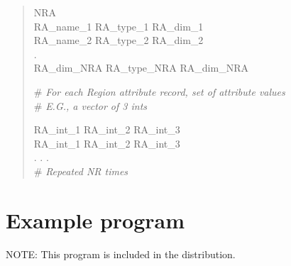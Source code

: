 \documentclass[12pt]{article}
\begin{document}
\begin{verse}
NRA \hspace{0.5ex} \\
RA\_name\_1 \hspace{0.5ex} RA\_type\_1 \hspace{0.5ex} RA\_dim\_1 \\ 
RA\_name\_2 \hspace{0.5ex} RA\_type\_2 \hspace{0.5ex} RA\_dim\_2 \\
. \\
RA\_dim\_NRA \hspace{0.5ex} RA\_type\_NRA \hspace{0.5ex} RA\_dim\_NRA 
\vspace{1ex}

\# \textit{For each Region attribute record, set of attribute values} \\
\# \textit{E.G., a vector of 3 ints}
\vspace{1ex}

RA\_int\_1 \hspace{0.5ex} RA\_int\_2 \hspace{0.5ex} RA\_int\_3 \\
RA\_int\_1 \hspace{0.5ex} RA\_int\_2 \hspace{0.5ex} RA\_int\_3 \\
. . .\\
\# \textit{Repeated NR times}
\vspace{2ex}

\end{verse}

\newpage

\section{Example program}

NOTE: This program is included in the distribution.
\end{document}
